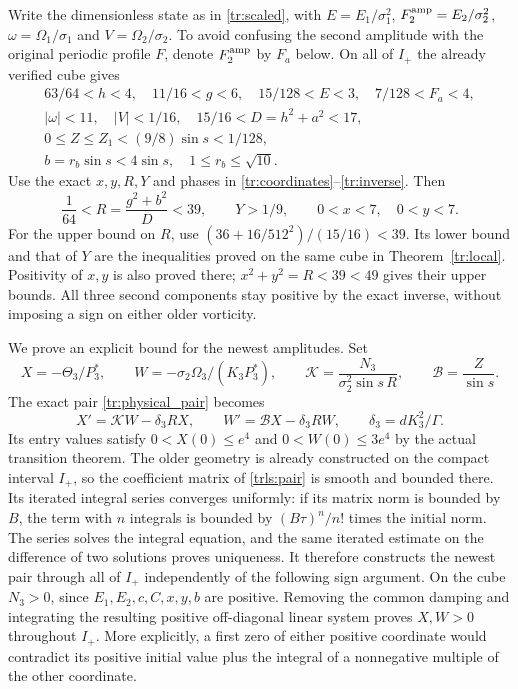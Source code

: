 Write the dimensionless state as in \eqref{tr:scaled}, with
$E=E_1/\sigma_1^2$, $F_2^{\rm amp}=E_2/\sigma_2^2$,
$\omega=\Omega_1/\sigma_1$ and $V=\Omega_2/\sigma_2$.
To avoid confusing the second amplitude with the original periodic
profile $F$, denote $F_2^{\rm amp}$ by $F_a$ below. On all of
$I_+$ the already verified cube gives
\begin{equation}\label{trls:cube}
 \begin{gathered}
 63/64<h<4,\quad 11/16<g<6,\quad
 15/128<E<3,\quad 7/128<F_a<4,\\
 |\omega|<11,\quad |V|<1/16,\quad
 15/16<D=h^2+a^2<17,\\
 0\leq Z\leq Z_1<(9/8)\sin s<1/128,\\
 b=r_b\sin s<4\sin s,\quad 1\leq r_b\leq\sqrt{10}.
 \end{gathered}
\end{equation}
Use the exact $x,y,R,Y$ and phases in
\eqref{tr:coordinates}--\eqref{tr:inverse}. Then
\begin{equation}\label{trls:phasebounds}
 \frac1{64}<R=\frac{g^2+b^2}{D}<39,
 \qquad Y>1/9,\qquad 0<x<7,\quad 0<y<7.
\end{equation}
For the upper bound on $R$, use
$(36+16/512^2)/(15/16)<39$. Its lower bound and that of
$Y$ are the inequalities proved on the same cube in
Theorem~\ref{tr:local}. Positivity of $x,y$ is also proved
there; $x^2+y^2=R<39<49$ gives their upper bounds.
All three second components stay positive by the exact inverse,
without imposing a sign on either older vorticity.

We prove an explicit bound for the newest amplitudes. Set
\[
 X=-\Theta_3/P_3^*,\qquad
 W=-\sigma_2\Omega_3/(K_3P_3^*),\qquad
 \mathcal K=\frac{N_3}{\sigma_2^2\sin s\,R},\qquad
 \mathcal B=\frac Z{\sin s}.
\]
The exact pair \eqref{tr:physical_pair} becomes
\begin{equation}\label{trls:pair}
 X'=\mathcal K W-\delta_3RX,\qquad
 W'=\mathcal B X-\delta_3RW,
 \qquad \delta_3=dK_3^2/\Gamma.
\end{equation}
Its entry values satisfy $0<X(0)\leq e^4$ and
$0<W(0)\leq3e^4$ by the actual transition theorem.
The older geometry is already constructed on the compact interval
$I_+$, so the coefficient matrix of \eqref{trls:pair} is smooth
and bounded there. Its iterated integral series converges uniformly:
if its matrix norm is bounded by $B$, the term with $n$ integrals
is bounded by $(B\tau)^n/n!$ times the initial norm.
The series solves the integral equation, and the same iterated
estimate on the difference of two solutions proves uniqueness.
It therefore constructs the newest pair through all of $I_+$
independently of the following sign argument.
On the cube $N_3>0$, since $E_1,E_2,c,C,x,y,b$ are positive.
Removing the common damping and integrating the resulting positive
off-diagonal linear system proves $X,W>0$ throughout $I_+$.
More explicitly, a first zero of either positive coordinate would
contradict its positive initial value plus the integral of a
nonnegative multiple of the other coordinate.

